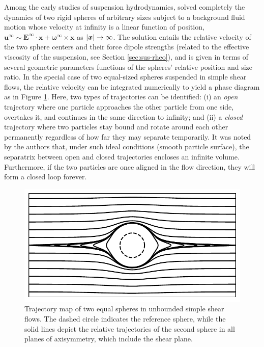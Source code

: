 Among the early studies of suspension hydrodynamics, \cite{batchelor_green_1972} solved completely the dynamics of two rigid spheres of arbitrary sizes subject to a background fluid motion whose velocity at infinity is a linear function of position, \ie
${\bm u}^\infty \sim {\bm E}^\infty \cdot {\bm x} + {\bm \omega}^\infty \times {\bm x}$ as $\lvert{\bm x}\rvert \to \infty$.
The solution entails the relative velocity of the two sphere centers and their force dipole strengths (related to the effective viscosity of the suspension, see Section \ref{sec:sus-rheo}), and is given in terms of several geometric parameters functions of the spheres' relative position and size ratio.
In the special case of two equal-sized spheres suspended in simple shear flows, the relative velocity can be integrated numerically to yield a phase diagram as in Figure \ref{fig:BG-traj}.
Here, two types of trajectories can be identified:
(i) an \emph{open} trajectory where one particle approaches the other particle from one side, overtakes it, and continues in the same direction to infinity; and
(ii) a \emph{closed} trajectory where two particles stay bound and rotate around each other permanently regardless of how far they may separate temporarily.
It was noted by the authors that, under such ideal conditions (\eg smooth particle surface), the separatrix between open and closed trajectories encloses an infinite volume.
Furthermore, if the two particles are once aligned in the flow direction, they will form a closed loop forever.

\begin{figure}%
  \centering
  \includegraphics[width=0.8\columnwidth]{BG-traj4.pdf}
  \caption{Trajectory map of two equal spheres in unbounded simple shear flows. The dashed circle indicates the reference sphere, while the solid lines depict the relative trajectories of the second sphere in all planes of axisymmetry, which include the shear plane.}
  \label{fig:BG-traj}
\end{figure}

